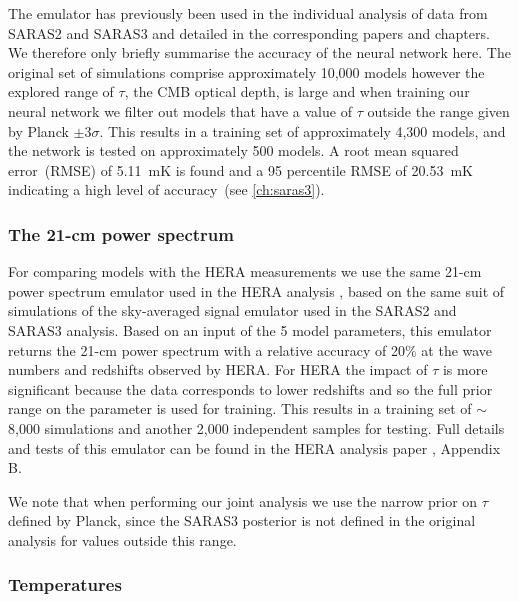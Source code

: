 The emulator has previously been used in the individual analysis of data from SARAS2 \cite{Bevins_SARAS2_2022} and SARAS3 \cite{Bevins_saras3_2022} and detailed in the corresponding papers and chapters. We therefore only briefly summarise the accuracy of the neural network here. The original set of simulations comprise approximately 10,000 models however the explored range of $\tau$, the CMB optical depth, is large and when training our neural network we filter out models that have a value of $\tau$ outside the range given by Planck $\pm 3\sigma$. This results in a training set of approximately 4,300 models, and the network is tested on approximately 500 models. A root mean squared error~(RMSE) of 5.11~mK is found and a 95 percentile RMSE of 20.53~mK indicating a high level of accuracy~(see \cref{ch:saras3}).

\subsubsection{The 21-cm power spectrum}
\label{sec:power_spec_emulation}

For comparing models with the HERA measurements we use the same 21-cm power spectrum emulator used in the HERA analysis \cite{HERA_2022b}, based on the same suit of simulations of the sky-averaged signal emulator used in the SARAS2 and SARAS3 analysis.
Based on an input of the 5 model parameters, this emulator returns the 21-cm power spectrum with a relative accuracy of 20\% at the wave numbers and redshifts observed by HERA. 
For HERA the impact of $\tau$ is more significant because the data corresponds to lower redshifts and so the full prior range on the parameter is used for training. This results in a training set of $\sim$8,000 simulations and another 2,000 independent samples for testing. Full details and tests of this emulator can be found in the HERA analysis paper \cite{HERA_2022b}, Appendix B.

We note that when performing our joint analysis we use the narrow prior on $\tau$ defined by Planck, since the SARAS3 posterior is not defined in the original analysis for values outside this range.

\subsubsection{Temperatures}
\label{sec:igm_temperature_emulation}

